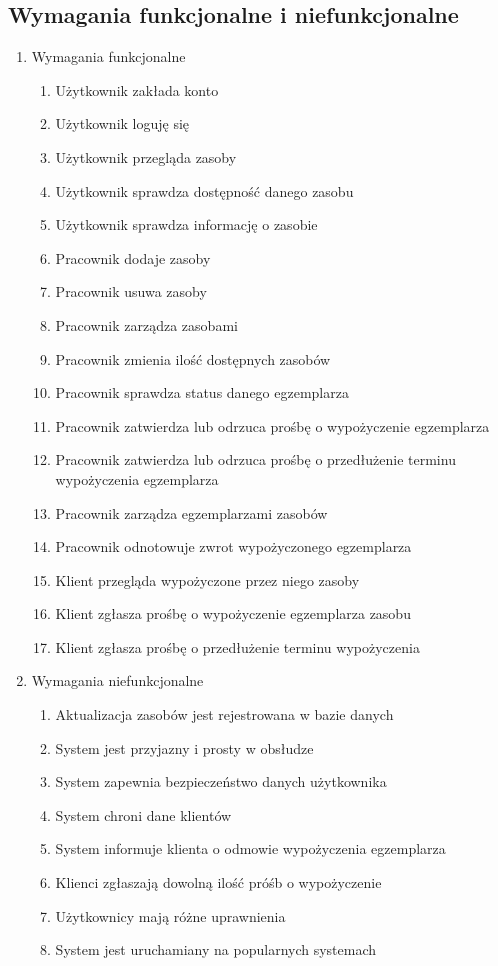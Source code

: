 \subsection{Wymagania funkcjonalne i niefunkcjonalne}
\begin{enumerate}
    \item Wymagania funkcjonalne
    \begin{enumerate}
        \item Użytkownik zakłada konto
        \item Użytkownik loguję się
        \item Użytkownik przegląda zasoby
        \item Użytkownik sprawdza dostępność danego zasobu
        \item Użytkownik sprawdza informację o zasobie
        \item Pracownik dodaje zasoby
        \item Pracownik usuwa zasoby
        \item Pracownik zarządza zasobami
        \item Pracownik zmienia ilość dostępnych zasobów
        \item Pracownik sprawdza status danego egzemplarza
        \item Pracownik zatwierdza lub odrzuca prośbę o wypożyczenie egzemplarza
        \item Pracownik zatwierdza lub odrzuca prośbę o przedłużenie terminu wypożyczenia egzemplarza
        \item Pracownik zarządza egzemplarzami zasobów
        \item Pracownik odnotowuje zwrot wypożyczonego egzemplarza
        \item Klient przegląda wypożyczone przez niego zasoby
        \item Klient zgłasza prośbę o wypożyczenie egzemplarza zasobu
        \item Klient zgłasza prośbę o przedłużenie terminu wypożyczenia
    \end{enumerate}
    \item Wymagania niefunkcjonalne
    \begin{enumerate}
        \item Aktualizacja zasobów jest rejestrowana w bazie danych
        \item System jest przyjazny i prosty w obsłudze
        \item System zapewnia bezpieczeństwo danych użytkownika
        \item System chroni dane klientów
        \item System informuje klienta o odmowie wypożyczenia egzemplarza
        \item Klienci zgłaszają dowolną ilość próśb o wypożyczenie
        \item Użytkownicy mają różne uprawnienia
        \item System jest uruchamiany na popularnych systemach
    \end{enumerate}
\end{enumerate}

